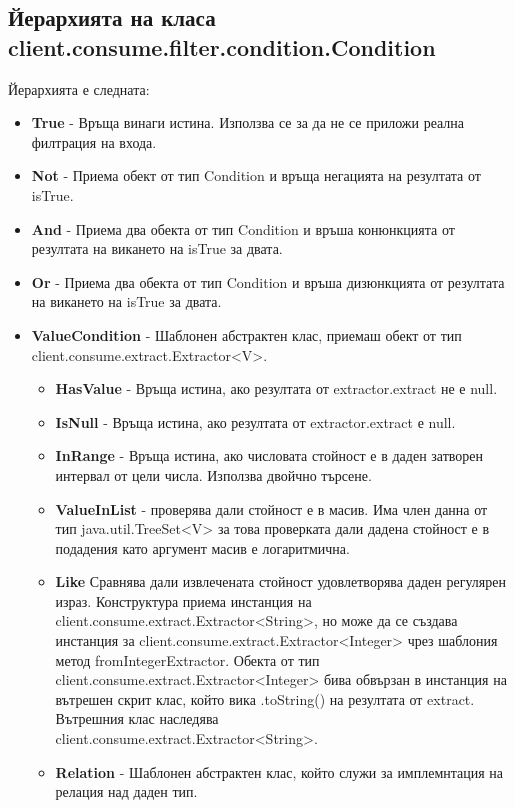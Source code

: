 \documentclass[a4paper, 12pt]{article}
\begin{document}
\subsection{Йерархията на класа client.consume.filter.condition.Condition}
Йерархията е следната:
\begin{itemize}
\item \textbf{True} - Връща винаги истина. Използва се за да не се приложи реална филтрация на входа.
\item \textbf{Not} - Приема обект от тип Condition и връща негацията на резултата от isTrue.
\item \textbf{And} - Приема два обекта от тип Condition и връша конюнкцията от резултата на викането на isTrue за двата.
\item \textbf{Or} - Приема два обекта от тип Condition и връша дизюнкцията от резултата на викането на isTrue за двата.
\item \textbf{ValueCondition} - Шаблонен абстрактен клас, приемаш обект от тип client.consume.extract.Extractor<V>.
\begin{itemize}
\item \textbf{HasValue} - Връща истина, ако резултата от extractor.extract не е null.
\item \textbf{IsNull} - Връща истина, ако резултата от extractor.extract е null.
\item \textbf{InRange} - Връща истина, ако числовата стойност е в даден затворен интервал от цели числа. Използва двойчно търсене.
\item \textbf{ValueInList} - проверява дали стойност е в масив. Има член данна от тип java.util.TreeSet<V> за това проверката дали дадена стойност е в подадения като аргумент масив е логаритмична.
\item \textbf{Like} Сравнява дали извлечената стойност удовлетворява даден регулярен израз.
Конструктура приема инстанция на \\
client.consume.extract.Extractor<String>,
но може да се създава инстанция за client.consume.extract.Extractor<Integer> чрез шаблония метод fromIntegerExtractor.
Обекта от тип \\
client.consume.extract.Extractor<Integer> бива обвързан в инстанция на вътрешен скрит клас, който вика .toString() на резултата от extract. Вътрешния клас наследява \\
client.consume.extract.Extractor<String>.
\item \textbf{Relation} - Шаблонен абстрактен клас, който служи за имплемнтация на релация над даден тип.
\begin{itemize}

\end{itemize}
\end{itemize}
\end{itemize}
\end{document}
